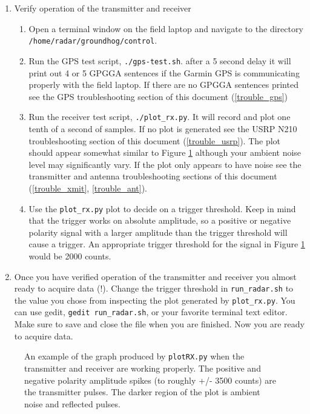 \documentclass[titlepage]{article}
\begin{document}
\begin{enumerate}
    \item Verify operation of the transmitter and receiver \begin{enumerate}
        \item Open a terminal window on the field laptop and navigate to the directory \\\verb+/home/radar/groundhog/control+.
        \item Run the GPS test script, \verb+./gps-test.sh+. after a 5 second delay it will print out 4 or 5 GPGGA sentences if the Garmin GPS is communicating properly with the field laptop. If there are no GPGGA sentences printed see the GPS troubleshooting section of this document (\ref{trouble_gps}) 
        \item Run the receiver test script, \verb+./plot_rx.py+. It will record and plot one tenth of a second of samples. If no plot is generated see the USRP N210 troubleshooting section of this document (\ref{trouble_usrp}). The plot should appear somewhat similar to Figure \ref{fig:plot_rx} although your ambient noise level may significantly vary. If the plot only appears to have noise see the transmitter and antenna troubleshooting sections of this document (\ref{trouble_xmit}, \ref{trouble_ant}).
        \item Use the \verb+plot_rx.py+ plot to decide on a trigger threshold. Keep in mind that the trigger works on absolute amplitude, so a positive or negative polarity signal with a larger amplitude than the trigger threshold will cause a trigger. An appropriate trigger threshold for the signal in Figure \ref{fig:plot_rx} would be 2000 counts.
    \end{enumerate}

    \item Once you have verified operation of the transmitter and receiver you almost ready to acquire data (!). Change the trigger threshold in \verb+run_radar.sh+ to the value you chose from inspecting the plot generated by \verb+plot_rx.py+. You can use gedit, \verb+gedit run_radar.sh+, or your favorite terminal text editor. Make sure to save and close the file when you are finished. Now you are ready to acquire data.
\end{enumerate}

\begin{figure}[h]
\centering
\cprotect\caption{An example of the graph produced by \verb:plotRX.py: when the transmitter and receiver are working properly. The positive and negative polarity amplitude spikes (to roughly +/- 3500 counts) are the transmitter pulses. The darker region of the plot is ambient noise and reflected pulses.}
\label{fig:plot_rx}
\end{figure}
\end{document}
